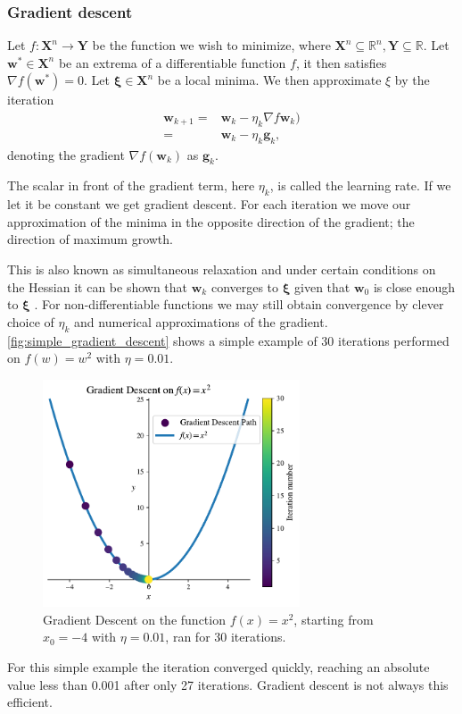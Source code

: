 \documentclass{article}
\theoremstyle{definition}
\begin{document}
\subsubsection{Gradient descent}
Let  $f: \mathbf{X}^n \rightarrow \mathbf{Y}$ be the function we wish to minimize, where $ \mathbf{X}^n \subseteq \mathbb{R}^n, \mathbf{Y}\subseteq \mathbb{R}$. Let $\boldsymbol{w}^* \in \mathbf{X}^n$ be an extrema of a differentiable function $f$, it then satisfies $\nabla f(\boldsymbol{w}^*) = 0$. Let $\boldsymbol{\xi} \in \mathbf{X}^n$ be a local minima. We then approximate $\xi$ by the iteration
\begin{equation}
\begin{aligned} 
    \boldsymbol{w}_{k+1} =& \boldsymbol{w}_k - \eta_k \nabla  f \boldsymbol{w}_k) \\
    =& \boldsymbol{w}_k - \eta_k  \boldsymbol{g}_k,
\end{aligned}
\label{eq:gradient_descent}
\end{equation}
denoting the gradient $\nabla f(\boldsymbol{w}_k)$ as $\boldsymbol{g}_k$.

The scalar in front of the gradient term, here $\eta_k$, is called the learning rate. If we let it be constant we get gradient descent. For each iteration we move our approximation of the minima in the opposite direction of the gradient; the direction of maximum growth. 

This is also known as simultaneous relaxation and under certain conditions on the Hessian it can be shown that $\boldsymbol{w}_k$ converges to $\boldsymbol{\xi}$  given that $\boldsymbol{w}_0$ is close enough to $\boldsymbol{\xi}$ \parencite[p.~117--118]{introNumeric}. For non-differentiable functions we may still obtain convergence by clever choice of $\eta_k$ and numerical approximations of the gradient. \autoref{fig:simple_gradient_descent} shows a simple example of 30 iterations performed on $f(w) = w^2$ with $\eta = 0.01$.

\begin{figure}[H]
    \centering
    \includegraphics[width=0.68\textwidth]{figures/simple_gradient_descent_x^2.pdf}
    \caption{Gradient Descent on the function $f(x)=x^2$, starting from $x_0 = -4$ with $\eta = 0.01$, ran for 30 iterations.}
    \label{fig:simple_gradient_descent}
\end{figure}
For this simple example the iteration converged quickly, reaching an absolute value less than 0.001 after only 27 iterations. Gradient descent is not always this efficient. 
\end{document}
